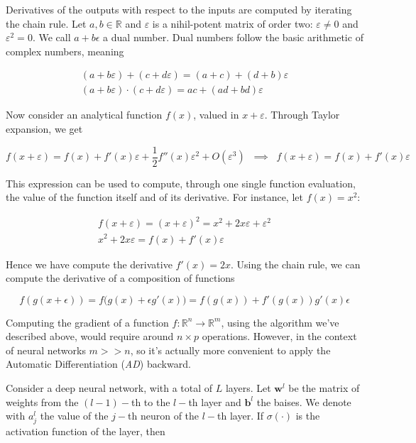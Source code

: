 \documentclass{article}
\numberwithin{equation}{subsection}
\begin{document}
Derivatives of the outputs with respect to the inputs are computed by iterating the chain rule. Let $a,b \in \mathbb{R}$ and $\varepsilon$ is a nihil-potent matrix of order two: $\varepsilon \neq 0$ and $\varepsilon^2 = 0$. We call $a+ b\epsilon$ a dual number. Dual numbers follow the basic arithmetic of complex numbers, meaning

\begin{gather*}
    (a+b\varepsilon) + (c+d\varepsilon)= (a+c) + (d+b)\varepsilon \\
    (a+b\varepsilon) \cdot (c+d\varepsilon) = ac + (ad+bd)\varepsilon
\end{gather*}

Now consider an analytical function $f(x)$, valued in $x+\varepsilon$. Through Taylor expansion, we get

\begin{equation*}
    f(x+\varepsilon) = f(x) + f'(x) \varepsilon + \frac{1}{2} f''(x) \varepsilon^2 + O(\varepsilon^3) \;\; \implies \;\; f(x+\varepsilon) = f(x) + f'(x) \varepsilon
\end{equation*}

This expression can be used to compute, through one single function evaluation, the value of the function itself and of its derivative. For instance, let $f(x) = x^2$:

\begin{gather*}
    f(x+\varepsilon) = (x+\varepsilon)^2 = x^2 + 2x \varepsilon + \varepsilon^2 \\
    x^2 + 2x \varepsilon = f(x) + f'(x) \varepsilon
\end{gather*}

Hence we have compute the derivative $f'(x) = 2x$. Using the chain rule, we can compute the derivative of a composition of functions

\begin{equation*}
    f(g(x+\epsilon)) = f\big(g(x)+\epsilon g'(x) \big) = f(g(x)) + f'(g(x)) g'(x) \epsilon
\end{equation*}

Computing the gradient of a function $f : \mathbb{R}^n \to \mathbb{R}^m$, using the algorithm we've described above, would require around $n \times p$ operations. However, in the context of neural networks $m >> n$, so it's actually more convenient to apply the Automatic Differentiation (\textit{AD}) backward.

Consider a deep neural network, with a total of $L$ layers. Let $\textbf{w}^l$ be the matrix of weights from the $(l-1)-$th to the $l-$th layer and $\textbf{b}^l$ the baises. We denote with $a_j^l$ the value of the $j-$th neuron of the $l-$th layer. If $\sigma(\cdot)$ is the activation function of the layer, then
\end{document}
